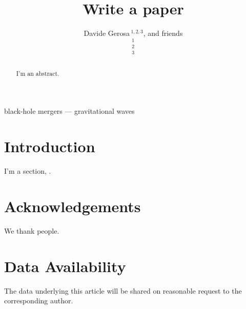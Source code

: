 \documentclass[fleqn,usenatbib]{mnras_tex_edited}
\title[Write a paper]{Write a paper}
\author[Gerosa et al.]{Davide Gerosa$\,$\orcidlink{0000-0002-0933-3579}$^{1,2,3}$, and friends
\medskip
\\
$^{1}$\milan\\
$^{2}$\infn\\
$^{3}$\bham\\
}
\begin{document}
\label{firstpage}
\pagerange{\pageref{firstpage}--\pageref{lastpage}}
\maketitle

\begin{abstract}

I'm an abstract. \lipsum[1]

\end{abstract}

\begin{keywords}
black-hole mergers --- gravitational waves
\end{keywords}


\section{Introduction}

I'm a section, \cite{2016PhRvL.116f1102A}. \lipsum[2-3]

\section*{Acknowledgements}

We thank people. \lipsum[4]



\section*{Data Availability}
The data underlying this article will be shared on reasonable request to the corresponding author.



 
\end{document}
